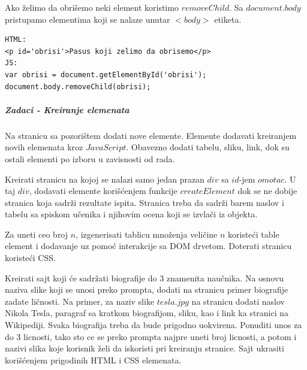Ako želimo da obrišemo neki element koristimo $removeChild$. Sa $document.body$ pristupamo elementima koji se nalaze unutar $<body>$ etiketa.
\begin{lstlisting}[backgroundcolor = \color{lightgray}, breaklines=true]
HTML:
<p id='obrisi'>Pasus koji zelimo da obrisemo</p>
JS:
var obrisi = document.getElementById('obrisi');
document.body.removeChild(obrisi);
\end{lstlisting}
\subparagraph{Zadaci - Kreiranje elemenata}
\begin{primer}
Na stranicu sa pozorištem dodati nove elemente. Elemente dodavati kreiranjem novih elemenata kroz $JavaScript$. Obavezno dodati tabelu, sliku, link, dok su ostali elementi po izboru u zavisnosti od rada.
\end{primer}

\begin{primer}
Kreirati stranicu na kojoj se nalazi samo jedan prazan $div$ sa $id$-jem $omotac$. U taj $div$, dodavati elemente korišćenjem funkcije $createElement$ dok se ne dobije stranica koja sadrži rezultate ispita. Stranica treba da sadrži barem naslov i tabelu sa spiskom učenika i njihovim ocena koji se izvlači iz objekta.
\end{primer}

\begin{primer}
Za uneti ceo broj $n$, izgenerisati tablicu množenja veličine $n$ koristeći table element i dodavanje uz pomoć interakcije sa DOM drvetom. Doterati stranicu koristeći CSS.
\end{primer}

\begin{primer}
Kreirati sajt koji će sadržati biografije do 3 znamenita naučnika. Na osnovu naziva slike koji se unosi preko prompta, dodati na stranicu primer biografije zadate ličnosti. Na primer, za naziv slike $tesla.jpg$ na stranicu dodati naslov Nikola Tesla, paragraf sa kratkom biografijom, sliku, kao i link ka stranici na Wikipediji. Svaka biografija treba da bude prigodno uokvirena. Ponuditi unos za do 3 licnosti, tako sto ce se preko prompta najpre uneti broj licnosti, a potom i nazivi slika koje korisnik želi da iskoristi pri kreiranju stranice. Sajt ukrasiti korišćenjem prigodinih HTML i CSS elemenata.
\end{primer}

